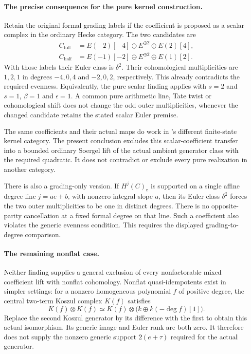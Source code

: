 \paragraph{The precise consequence for the pure kernel construction.}
Retain the original formal grading labels if the
 coefficient is proposed as a scalar complex
in the ordinary Hecke category. The two candidates are
\[
 \begin{aligned}
 C_{\mathrm{full}}
   &=E(-2)[-4]\oplus E^{\oplus2}\oplus E(2)[4],\\
 C_{\mathrm{half}}
   &=E(-1)[-2]\oplus E^{\oplus2}\oplus E(1)[2].
 \end{aligned}
\]
With those labels their Euler class is \(\delta^2\).
Their cohomological multiplicities are \(1,2,1\) in
degrees \(-4,0,4\) and \(-2,0,2\), respectively.
This already contradicts the required evenness.
Equivalently, the pure scalar finding applies with
\(s=2\) and \(s=1\), \(\beta=1\) and \(\epsilon=1\).
A common pure arithmetic line, Tate twist or
cohomological shift does not change the odd outer
multiplicities, whenever the changed candidate retains
the stated scalar Euler premise.

The same coefficients and their actual maps do work
in 's different finite-state kernel category.
The present conclusion excludes this scalar-coefficient
transfer into a bounded ordinary Soergel lift of the
actual ambient generator class with the required
quadratic. It does not contradict  or exclude
every pure realization in another category.

There is also a grading-only version. If
\(H^j(C)_e\) is supported on a single affine degree
line \(j=ae+b\), with nonzero integral slope \(a\),
then its Euler class \(\delta^2\) forces the two
outer multiplicities to be one in distinct degrees.
There is no opposite-parity cancellation at a fixed
formal degree on that line. Such a coefficient also
violates the generic evenness condition.
This requires the displayed grading-to-degree comparison.

\paragraph{The remaining nonflat case.}
Neither finding supplies a general exclusion of every
nonfactorable mixed coefficient lift with nonflat
cohomology. Nonflat quasi-idempotents exist in simpler
settings: for a nonzero homogeneous polynomial \(f\)
of positive degree,
the central two-term Koszul complex \(K(f)\) satisfies
\[
 K(f)\otimes K(f)
   \simeq K(f)\otimes
             \bigl(k\oplus k(-\deg f)[1]\bigr).
\]
Replace the second Koszul generator by its difference
with the first to obtain this actual isomorphism.
Its generic image and Euler rank are both zero.
It therefore does not supply the nonzero generic
support \(2(e+\tau)\) required for the actual generator.

